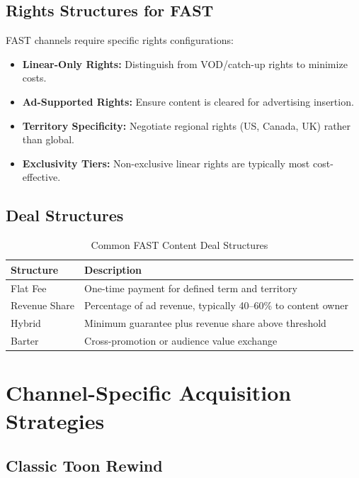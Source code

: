 \documentclass[12pt,letterpaper,twoside]{report}
\begin{document}
\subsection{Rights Structures for FAST}

FAST channels require specific rights configurations:

\begin{itemize}[leftmargin=1.5cm]
    \item \textbf{Linear-Only Rights:} Distinguish from VOD/catch-up rights to minimize costs.
    \item \textbf{Ad-Supported Rights:} Ensure content is cleared for advertising insertion.
    \item \textbf{Territory Specificity:} Negotiate regional rights (US, Canada, UK) rather than global.
    \item \textbf{Exclusivity Tiers:} Non-exclusive linear rights are typically most cost-effective.
\end{itemize}

\subsection{Deal Structures}

\begin{table}[H]
\centering
\caption{Common FAST Content Deal Structures}
\label{tab:deal-structures}
\begin{tabular}{@{}L{3.5cm}L{10cm}@{}}
\toprule
\textbf{Structure} & \textbf{Description} \\
\midrule
Flat Fee & One-time payment for defined term and territory \\
Revenue Share & Percentage of ad revenue, typically 40--60\% to content owner \\
Hybrid & Minimum guarantee plus revenue share above threshold \\
Barter & Cross-promotion or audience value exchange \\
\bottomrule
\end{tabular}
\end{table}

\section{Channel-Specific Acquisition Strategies}

\subsection{Classic Toon Rewind}
\end{document}
